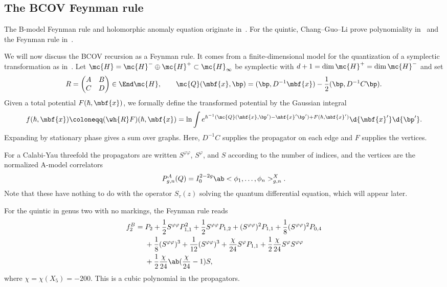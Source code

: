 \subsection{The BCOV Feynman rule}%
\label{sub:The BCOV Feynman rule}

The B-model Feynman rule and holomorphic anomaly equation originate in~\cite{BCOV1994}. For the quintic, Chang--Guo--Li prove polynomiality in~\cite{CGL2021} and the Feynman rule in~\cite{CGL2026}.

We will now discuss the BCOV recursion as a Feynman rule. It comes from a finite-dimensional model for the quantization of a symplectic transformation as in~. Let \(\mc{H} = \mc{H}^- \oplus \mc{H}^+ \subset \mc{H}_{\infty}\) be symplectic with \(d+1 = \dim \mc{H}^+ = \dim \mc{H}^-\) and set
\[ R = \begin{pmatrix} A & B \\ C & D \end{pmatrix} \in \End \mc{H}, \qquad \mc{Q}(\mbf{x},\bp) = (\bp, D^{-1}\mbf{x}) - \frac{1}{2}(\bp, D^{-1}C\bp). \]
Given a total potential \(F(\hbar, \mbf{x})\), we formally define the transformed potential by the Gaussian integral
\[ f(\hbar, \mbf{x}) \coloneqq (\wh{R}F)(\hbar,\mbf{x}) = \ln \int e^{\hbar^{-1}(\mc{Q}(\mbf{x},\bp') - \mbf{x}'\bp') + F(\hbar,\mbf{x}')}\d{\mbf{x}'}\d{\bp'}. \]
Expanding by stationary phase gives a sum over graphs. Here, \(D^{-1}C\) supplies the propagator on each edge and \(F\) supplies the vertices.

For a Calabi-Yau threefold the propagators are written \(S^{\varphi\varphi}\), \(S^{\varphi}\), and \(S\) according to the number of indices, and the vertices are the normalized A-model correlators
\[ P^A_{g,n}(Q) = I_0^{2-2g}\ab<\phi_1, \ldots, \phi_n>^X_{g,n}. \]
Note that these have nothing to do with the operator \(S_{\tau}(z)\) solving the quantum differential equation, which will appear later.

\begin{exm}
    For the quintic in genus two with no markings, the Feynman rule reads
    \begin{align*}
        f_2^B ={}& P_2 + \frac{1}{2}S^{\varphi\varphi}P_{1,1}^2 + \frac{1}{2}S^{\varphi\varphi}P_{1,2} + (S^{\varphi\varphi})^2 P_{1,1} + \frac{1}{8}(S^{\varphi\varphi})^2 P_{0,4} \\
        &+ \frac{1}{8}(S^{\varphi\varphi})^3 + \frac{1}{12}(S^{\varphi\varphi})^3 + \frac{\chi}{24}S^{\varphi}P_{1,1} + \frac{1}{2}\frac{\chi}{24}S^{\varphi}S^{\varphi\varphi} \\
        &+ \frac{1}{2}\frac{\chi}{24}\ab(\frac{\chi}{24}-1)S,
    \end{align*}
    where \(\chi = \chi(X_5) = -200\). This is a cubic polynomial in the propagators.
\end{exm}

